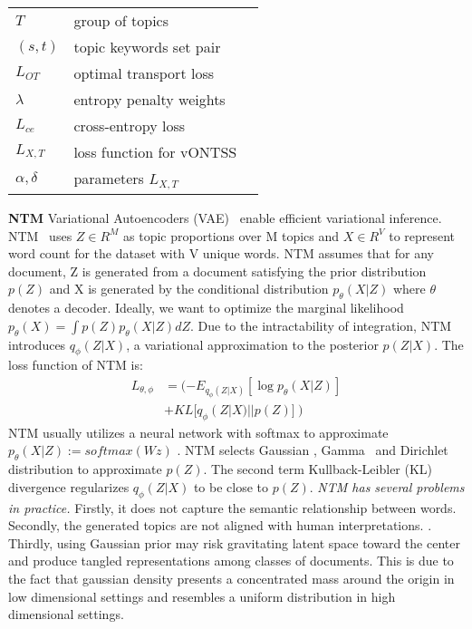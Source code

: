 \documentclass[11pt]{article}
\begin{document}
\begin{table}[t]
\begin{center}
\begin{small}
{\begin{tabular}{lll}
$T$ & group of topics & \\
$(s, t)$ & topic keywords set pair & \\
$L_{OT}$ & optimal transport loss & \\
$\lambda$ & entropy penalty weights & \\
$L_{ce}$ & cross-entropy loss & \\
$L_{X, T}$ & loss function for vONTSS & \\
$\alpha, \delta$ & parameters $L_{X, T}$ & \\
\hline
\end{tabular}}
\end{small}
\end{center}
\vskip -0.1in
\end{table}









\textbf{NTM} Variational Autoencoders (VAE)~\cite{https://doi.org/10.48550/arxiv.1312.6114} enable efficient variational inference. NTM~\cite{https://doi.org/10.48550/arxiv.1511.06038} uses $Z \in R^{M}$ as topic proportions over M topics and $X \in R^{V}$ to represent word count for the dataset with V unique words. NTM assumes that for any document, Z is generated from a document satisfying the prior distribution $p(Z)$ and X is generated by the conditional distribution $p_{\theta}(X|Z)$ where $\theta$ denotes a decoder. Ideally, we want to optimize the marginal likelihood $p_{\theta}(X) = \int{p(Z)p_{\theta}(X|Z)dZ}$. Due to the intractability of integration, NTM introduces $q_{\phi}(Z|X)$, a variational approximation to the posterior $p(Z|X)$. The loss function of NTM is: 
\begin{equation}
\begin{aligned}
L_{\theta, \phi} &= (-E_{q_{\phi}(Z|X)}[\log p_{\theta} (X|Z)] \\
    &+ KL[q_{\phi}(Z|X) || p(Z)] )
\end{aligned}
\label{eq10}
\end{equation} 
NTM usually utilizes a neural network with softmax to approximate $p_{\theta}(X|Z) := softmax(Wz)$ \cite{srivastava2017autoencoding}. NTM selects Gaussian \cite{miao2016neural}, Gamma~\cite{zhang2020whai} and Dirichlet distribution \cite{JMLR:v20:18-569} to approximate $p(Z)$. The second term Kullback-Leibler (KL) divergence regularizes  $q_{\phi}(Z|X)$ to be close to $p(Z)$. \textit{NTM has several problems in practice.} Firstly, it does not capture the semantic relationship between words. Secondly, the generated topics are not aligned with human interpretations. \cite{hoyle2021automated}.  Thirdly, using Gaussian prior may risk gravitating latent space toward the center and produce tangled representations among classes of documents. This is due to the fact that gaussian density presents a concentrated mass around the origin in low dimensional settings \cite{2013} and resembles a uniform distribution in high dimensional settings. 
\end{document}
